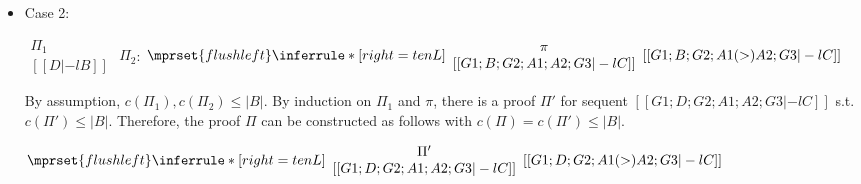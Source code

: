 \begin{itemize}
\item Case 2:
      \begin{center}
        \scriptsize
        \begin{math}
          \begin{array}{c}
            \Pi_1 \\
            {[[D |-l B]]}
          \end{array}
        \end{math}
        \qquad\qquad
        $\Pi_2$:
        \begin{math}
          $$\mprset{flushleft}
          \inferrule* [right={\tiny tenL}] {
            {
              \begin{array}{c}
                \pi \\
                {[[G1; B; G2; A1; A2; G3 |-l C]]}
              \end{array}
            }
          }{[[G1; B; G2; A1 (>) A2; G3 |-l C]]}
        \end{math}
      \end{center}
      By assumption, $c(\Pi_1),c(\Pi_2)\leq |B|$. By induction on $\Pi_1$
      and $\pi$, there is a proof $\Pi'$ for sequent
      $[[G1; D; G2; A1; A2; G3 |-l C]]$ s.t. $c(\Pi') \leq |B|$. Therefore,
      the proof $\Pi$ can be constructed as follows with
      $c(\Pi) = c(\Pi') \leq |B|$.
      \begin{center}
        \scriptsize
        \begin{math}
          $$\mprset{flushleft}
          \inferrule* [right={\tiny tenL}] {
            {
              \begin{array}{c}
                \Pi' \\
                {[[G1; D; G2; A1; A2; G3 |-l C]]}
              \end{array}
            }
          }{[[G1; D; G2; A1 (>) A2; G3 |-l C]]}
        \end{math}
      \end{center}


\end{itemize}

